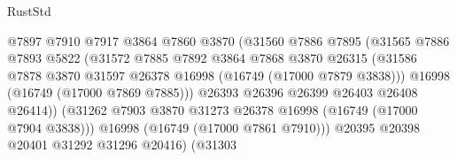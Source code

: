 \begin{lexlean}{RustStd}
\begin{coremodule}
                                        @7897
                                        @7910
                                        @7917
                                        @3864
                                        @7860
                                        @3870
                                        (@31560
                                          @7886
                                          @7895
                                          (@31565
                                            @7886
                                            @7893
                                            @5822
                                            (@31572
                                              @7885
                                              @7892
                                              @3864
                                              @7868
                                              @3870
                                              @26315
                                              (@31586
                                                @7878
                                                @3870
                                                @31597
                                                @26378
                                                @16998
                                                (@16749 (@17000 @7879 @3838)))
                                              @16998
                                              (@16749 (@17000 @7869 @7885)))
                                            @26393
                                            @26396
                                            @26399
                                            @26403
                                            @26408
                                            @26414))
                                        (@31262
                                          @7903
                                          @3870
                                          @31273
                                          @26378
                                          @16998
                                          (@16749 (@17000 @7904 @3838)))
                                        @16998
                                        (@16749 (@17000 @7861 @7910)))
                                      @20395
                                      @20398
                                      @20401
                                      @31292
                                      @31296
                                      @20416)
                                    (@31303

\end{coremodule}
\end{lexlean}
